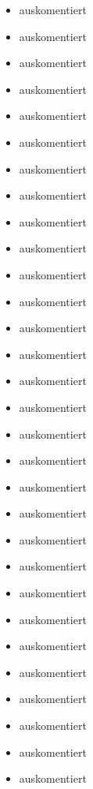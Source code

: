 \begin{itemize}
    \item {} auskomentiert
    \item {} auskomentiert
    \item {} auskomentiert
    \item {} auskomentiert
    \item {} auskomentiert
    \item {} auskomentiert
    \item {} auskomentiert
    \item {} auskomentiert
    \item {} auskomentiert
    \item {} auskomentiert
    \item {} auskomentiert
    \item {} auskomentiert
    \item {} auskomentiert
    \item {} auskomentiert
    \item {} auskomentiert
    \item {} auskomentiert
    \item {} auskomentiert
    \item {} auskomentiert
    \item {} auskomentiert
    \item {} auskomentiert
    \item {} auskomentiert
    \item {} auskomentiert
    \item {} auskomentiert
    \item {} auskomentiert
    \item {} auskomentiert
    \item {} auskomentiert
    \item {} auskomentiert
    
    
    \item {} auskomentiert
    
    
    \item {} auskomentiert
    \item {} auskomentiert
    

\end{itemize}
